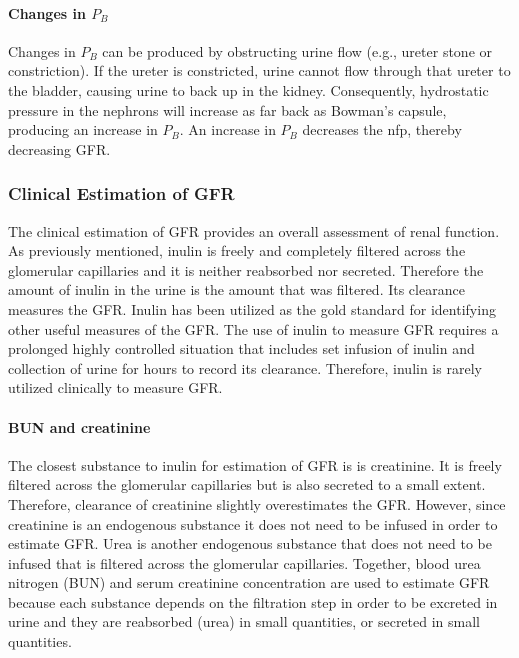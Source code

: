 \paragraph{Changes in $P_{B}$}
Changes in $P_{B}$ can be produced by obstructing urine flow (e.g., ureter stone or constriction). If the ureter is constricted, urine cannot flow through that ureter to the bladder, causing urine to back up in the kidney. Consequently, hydrostatic pressure in the nephrons will increase as far back as Bowman’s capsule, producing an increase in $P_{B}$. An increase in $P_{B}$ decreases the nfp, thereby decreasing GFR. 


\subsubsection{Clinical Estimation of GFR}

The clinical estimation of GFR provides an overall assessment of renal function. As previously mentioned, inulin is freely and completely filtered across the glomerular capillaries and it is neither reabsorbed nor secreted. Therefore the amount of inulin in the urine is the amount that was filtered. Its clearance measures the GFR. Inulin has been utilized as the gold standard for identifying other useful measures of the GFR. The use of inulin to measure GFR requires a prolonged highly controlled situation that includes set infusion of inulin and collection of urine for hours to record its clearance. Therefore, inulin is rarely utilized clinically to measure GFR.

\paragraph{BUN and creatinine}

The closest substance to inulin for estimation of GFR is is creatinine. It is freely filtered across the glomerular capillaries but is also secreted to a small extent. Therefore, clearance of creatinine slightly overestimates the GFR. However, since creatinine is an endogenous substance it does not need to be infused in order to estimate GFR. Urea is another endogenous substance that does not need to be infused that is filtered across the glomerular capillaries. Together, blood urea nitrogen (BUN) and serum creatinine concentration are used to estimate GFR because each substance depends on the filtration step in order to be excreted in urine and they are reabsorbed (urea) in small quantities, or secreted in small quantities. 

